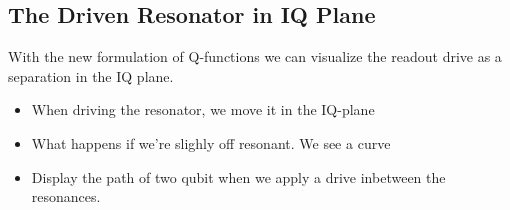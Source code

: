 \subsection{The Driven Resonator in IQ Plane}
With the new formulation of Q-functions we can visualize the readout drive as a separation in the IQ plane. 

\begin{itemize}
    \item When driving the resonator, we move it in the IQ-plane
    \item What happens if we're slighly off resonant. We see a curve
    \item Display the path of two qubit when we apply a drive inbetween the resonances. 
\end{itemize}


